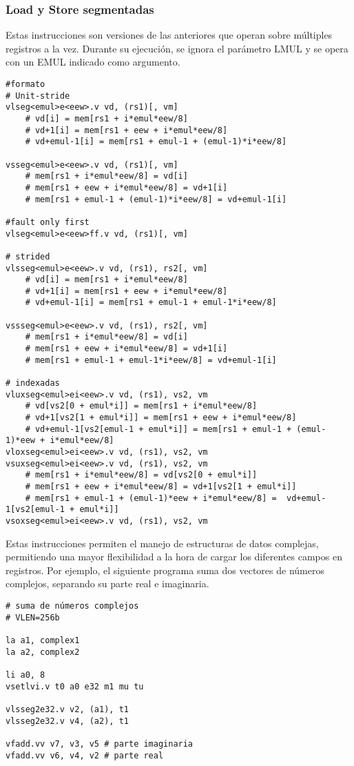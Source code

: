 \subsubsection{Load y Store segmentadas}
Estas instrucciones son versiones de las anteriores que operan sobre múltiples
registros a la vez. Durante su ejecución, se ignora el parámetro LMUL y se opera con un EMUL indicado como
argumento.

\begin{lstlisting}
#formato
# Unit-stride
vlseg<emul>e<eew>.v vd, (rs1)[, vm] 
    # vd[i] = mem[rs1 + i*emul*eew/8] 
    # vd+1[i] = mem[rs1 + eew + i*emul*eew/8]
    # vd+emul-1[i] = mem[rs1 + emul-1 + (emul-1)*i*eew/8]

vsseg<emul>e<eew>.v vd, (rs1)[, vm]
    # mem[rs1 + i*emul*eew/8] = vd[i]
    # mem[rs1 + eew + i*emul*eew/8] = vd+1[i]
    # mem[rs1 + emul-1 + (emul-1)*i*eew/8] = vd+emul-1[i]

#fault only first
vlseg<emul>e<eew>ff.v vd, (rs1)[, vm]

# strided
vlsseg<emul>e<eew>.v vd, (rs1), rs2[, vm]
    # vd[i] = mem[rs1 + i*emul*eew/8] 
    # vd+1[i] = mem[rs1 + eew + i*emul*eew/8]
    # vd+emul-1[i] = mem[rs1 + emul-1 + emul-1*i*eew/8]

vssseg<emul>e<eew>.v vd, (rs1), rs2[, vm]
    # mem[rs1 + i*emul*eew/8] = vd[i]                   
    # mem[rs1 + eew + i*emul*eew/8] = vd+1[i]
    # mem[rs1 + emul-1 + emul-1*i*eew/8] = vd+emul-1[i]

# indexadas
vluxseg<emul>ei<eew>.v vd, (rs1), vs2, vm
    # vd[vs2[0 + emul*i]] = mem[rs1 + i*emul*eew/8]
    # vd+1[vs2[1 + emul*i]] = mem[rs1 + eew + i*emul*eew/8]
    # vd+emul-1[vs2[emul-1 + emul*i]] = mem[rs1 + emul-1 + (emul-1)*eew + i*emul*eew/8]
vloxseg<emul>ei<eew>.v vd, (rs1), vs2, vm
vsuxseg<emul>ei<eew>.v vd, (rs1), vs2, vm
    # mem[rs1 + i*emul*eew/8] = vd[vs2[0 + emul*i]]
    # mem[rs1 + eew + i*emul*eew/8] = vd+1[vs2[1 + emul*i]]
    # mem[rs1 + emul-1 + (emul-1)*eew + i*emul*eew/8] =  vd+emul-1[vs2[emul-1 + emul*i]]
vsoxseg<emul>ei<eew>.v vd, (rs1), vs2, vm

\end{lstlisting}

Estas instrucciones permiten el manejo de estructuras de datos complejas,
permitiendo una mayor flexibilidad a la hora de cargar los diferentes campos en registros. Por
ejemplo, el siguiente programa suma dos vectores de números complejos,
separando su parte real e imaginaria.

\begin{lstlisting}
# suma de números complejos
# VLEN=256b

la a1, complex1
la a2, complex2

li a0, 8 
vsetlvi.v t0 a0 e32 m1 mu tu

vlsseg2e32.v v2, (a1), t1
vlsseg2e32.v v4, (a2), t1

vfadd.vv v7, v3, v5 # parte imaginaria
vfadd.vv v6, v4, v2 # parte real
\end{lstlisting}


